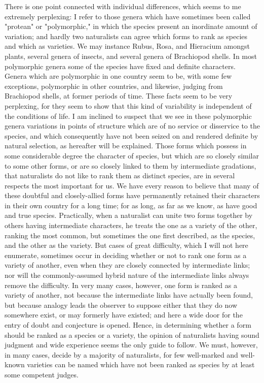 There is one point connected with individual differences, which seems to me extremely perplexing: I refer to those genera which have sometimes been called "protean" or "polymorphic," in which the species present an inordinate amount of variation; and hardly two naturalists can agree which forms to rank as species and which as varieties. We may instance Rubus, Rosa, and Hieracium amongst plants, several genera of insects, and several genera of Brachiopod shells. In most polymorphic genera some of the species have fixed and definite characters. Genera which are polymorphic in one country seem to be, with some few exceptions, polymorphic in other countries, and likewise, judging from Brachiopod shells, at former periods of time. These facts seem to be very perplexing, for they seem to show that this kind of variability is independent of the conditions of life. I am inclined to suspect that we see in these polymorphic genera variations in points of structure which are of no service or disservice to the species, and which consequently have not been seized on and rendered definite by natural selection, as hereafter will be explained.
Those forms which possess in some considerable degree the character of species, but which are so closely similar to some other forms, or are so closely linked to them by intermediate gradations, that naturalists do not like to rank them as distinct species, are in several respects the most important for us. We have every reason to believe that many of these doubtful and closely-allied forms have permanently retained their characters in their own country for a long time; for as long, as far as we know, as have good and true species. Practically, when a naturalist can unite two forms together by others having intermediate characters, he treats the one as a variety of the other, ranking the most common, but sometimes the one first described, as the species, and the other as the variety. But cases of great difficulty, which I will not here enumerate, sometimes occur in deciding whether or not to rank one form as a variety of another, even when they are closely connected by intermediate links; nor will the commonly-assumed hybrid nature of the intermediate links always remove the difficulty. In very many cases, however, one form is ranked as a variety of another, not because the intermediate links have actually been found, but because analogy leads the observer to suppose either that they do now somewhere exist, or may formerly have existed; and here a wide door for the entry of doubt and conjecture is opened.
Hence, in determining whether a form should be ranked as a species or a variety, the opinion of naturalists having sound judgment and wide experience seems the only guide to follow. We must, however, in many cases, decide by a majority of naturalists, for few well-marked and well-known varieties can be named which have not been ranked as species by at least some competent judges.
